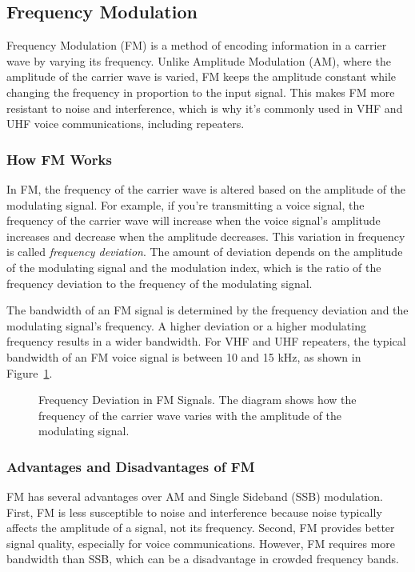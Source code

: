 \subsection{Frequency Modulation}
\label{subsec:fm}

Frequency Modulation (FM) is a method of encoding information in a carrier wave by varying its frequency. Unlike Amplitude Modulation (AM), where the amplitude of the carrier wave is varied, FM keeps the amplitude constant while changing the frequency in proportion to the input signal. This makes FM more resistant to noise and interference, which is why it's commonly used in VHF and UHF voice communications, including repeaters.

\subsubsection*{How FM Works}
In FM, the frequency of the carrier wave is altered based on the amplitude of the modulating signal. For example, if you're transmitting a voice signal, the frequency of the carrier wave will increase when the voice signal's amplitude increases and decrease when the amplitude decreases. This variation in frequency is called \textit{frequency deviation}. The amount of deviation depends on the amplitude of the modulating signal and the modulation index, which is the ratio of the frequency deviation to the frequency of the modulating signal.

The bandwidth of an FM signal is determined by the frequency deviation and the modulating signal's frequency. A higher deviation or a higher modulating frequency results in a wider bandwidth. For VHF and UHF repeaters, the typical bandwidth of an FM voice signal is between 10 and 15 kHz, as shown in Figure~\ref{fig:fm-deviation}.

\begin{figure}[htbp]
    \centering
    \caption{Frequency Deviation in FM Signals. The diagram shows how the frequency of the carrier wave varies with the amplitude of the modulating signal.}
    \label{fig:fm-deviation}
\end{figure}

\subsubsection*{Advantages and Disadvantages of FM}
FM has several advantages over AM and Single Sideband (SSB) modulation. First, FM is less susceptible to noise and interference because noise typically affects the amplitude of a signal, not its frequency. Second, FM provides better signal quality, especially for voice communications. However, FM requires more bandwidth than SSB, which can be a disadvantage in crowded frequency bands.

